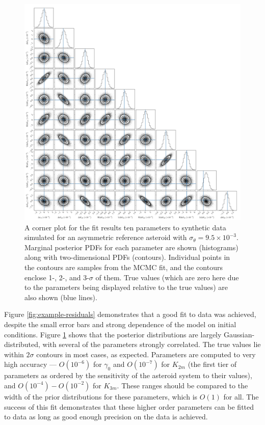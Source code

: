 \documentclass{aastex631}
\begin{document}
\begin{figure}
  \centering
  \includegraphics[width=\textwidth]{example-corner.pdf}
  \caption{A corner plot for the fit results ten parameters to synthetic data simulated for an asymmetric reference asteroid with $\sigma_\theta = 9.5 \times 10^{-3}$. Marginal posterior PDFs for each parameter are shown (histograms) along with two-dimensional PDFs (contours). Individual points in the contours are samples from the MCMC fit, and the contours enclose 1-, 2-, and 3-$\sigma$ of them. True values (which are zero here due to the parameters being displayed relative to the true values) are also shown (blue lines).}
  \label{fig:example-corner}
\end{figure}

Figure \ref{fig:example-residuals} demonstrates that a good fit to data was achieved, despite the small error bars and strong dependence of the model on initial conditions. Figure \ref{fig:example-corner} shows that the posterior distributions are largely Gaussian-distributed, with several of the parameters strongly correlated. The true values lie within $2\sigma$ contours in most cases, as expected. Parameters are computed to very high accuracy --- $O(10^{-6})$ for $\gamma_0$ and $O(10^{-7})$ for $K_{2m}$ (the first tier of parameters as ordered by the sensitivity of the asteroid system to their values), and $O(10^{-4})-O(10^{-2})$ for $K_{3m}$. These ranges should be compared to the width of the prior distributions for these parameters, which is $O(1)$ for all. The success of this fit demonstrates that these higher order parameters can be fitted to data as long as good enough precision on the data is achieved.



{}

\end{document}
